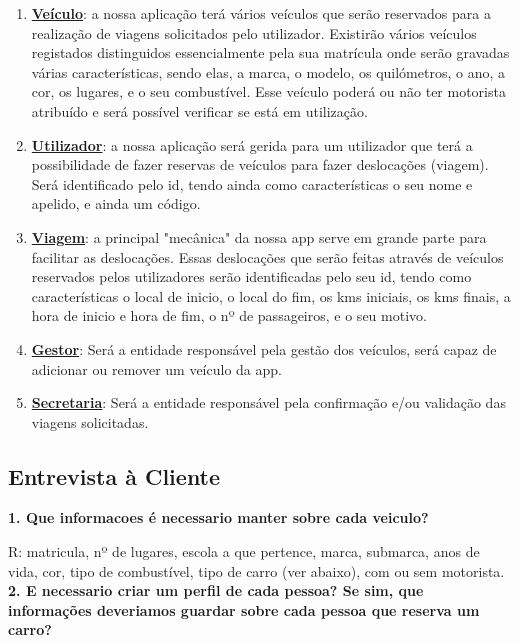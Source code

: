 \documentclass[11pt,a4paper]{report}%
\begin{document}
\begin{enumerate}[]
\item \textbf{\underline {Veículo}}: a nossa aplicação terá vários veículos que serão reservados para a realização de viagens solicitados pelo utilizador. Existirão vários veículos registados distinguidos essencialmente pela sua matrícula onde serão gravadas várias características, sendo elas, a marca, o modelo, os quilómetros, o ano, a cor, os lugares, e o seu combustível. Esse veículo poderá ou não ter motorista atribuído e será possível verificar se está em utilização.

\item \textbf{\underline {Utilizador}}: a nossa aplicação será gerida para um utilizador que terá a possibilidade de fazer reservas de veículos para fazer deslocações (viagem). Será identificado pelo id, tendo ainda como características o seu nome e apelido, e ainda um código.

\item \textbf{\underline {Viagem}}: a principal "mecânica" da nossa app serve em grande parte para facilitar as deslocações. Essas deslocações que serão feitas através de veículos reservados pelos utilizadores serão identificadas pelo seu id, tendo como características o local de inicio, o local do fim, os kms iniciais, os kms finais, a hora de inicio e hora de fim, o nº de passageiros, e o seu motivo.

\item \textbf{\underline {Gestor}}: Será a entidade responsável pela gestão dos veículos, será capaz de adicionar ou remover um veículo da app.

\item \textbf{\underline {Secretaria}}: Será a entidade responsável pela confirmação e/ou validação das viagens solicitadas. 



\end{enumerate}
\newpage
\subsection{Entrevista à Cliente}

\textbf{1. Que informacoes é necessario manter sobre cada veiculo?}

R: matricula, nº de lugares, escola a que pertence, marca, submarca, anos de vida, cor, tipo de combustível, tipo de carro (ver abaixo), com ou sem motorista.
\newline
\textbf{2. E necessario criar um perfil de cada pessoa? Se sim, que informações deveriamos guardar sobre cada pessoa que reserva um carro?}
\end{document}
